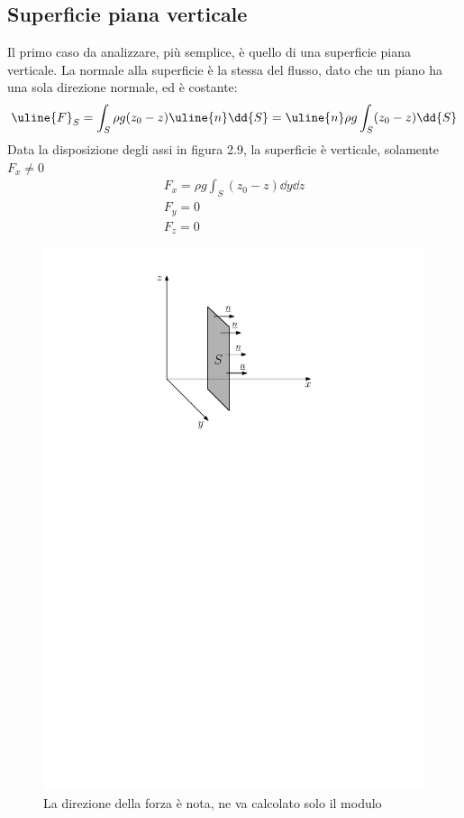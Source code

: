 \subsection{Superficie piana verticale}
Il primo caso da analizzare, più semplice, è quello di una superficie piana verticale. La normale alla superficie è la stessa del flusso, dato che un piano ha una sola direzione normale, ed è costante:
	\begin{equation*}
		\uline{F}_S = \int_S \rho g (z_0 - z) \uline{n} \dd{S} = \uline{n} \rho g \int_S (z_0 - z) \dd{S}
	\end{equation*}
Data la disposizione degli assi in figura 2.9, la superficie è verticale, solamente $F_x \neq 0$
	\begin{equation*}
		\begin{gathered}
			F_x = \rho g \int_S (z_0 -z) \dd{y} \dd{z} \\
			F_y = 0 \\
			F_z = 0
		\end{gathered}
	\end{equation*}
	\begin{figure}[h]
		\includegraphics[scale=0.80]{./2.4 Spinte sulle superfici/2.4-1}
		\centering
		\caption{La direzione della forza è nota, ne va calcolato solo il modulo}
	\end{figure}
